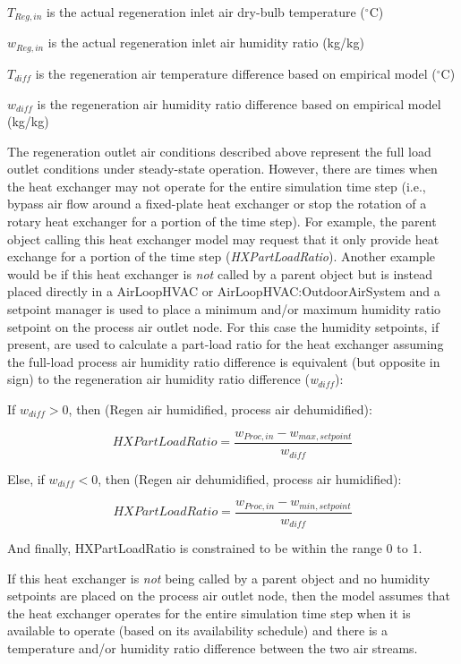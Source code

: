 \({T_{Reg,in}}\) is the actual regeneration inlet air dry-bulb temperature (\(^{\circ}\)C)

\({w_{Reg,in}}\) is the actual regeneration inlet air humidity ratio (kg/kg)

\({T_{diff}}\) is the regeneration air temperature difference based on empirical model (\(^{\circ}\)C)

\({w_{diff}}\) is the regeneration air humidity ratio difference based on empirical model (kg/kg)

The regeneration outlet air conditions described above represent the full load outlet conditions under steady-state operation. However, there are times when the heat exchanger may not operate for the entire simulation time step (i.e., bypass air flow around a fixed-plate heat exchanger or stop the rotation of a rotary heat exchanger for a portion of the time step). For example, the parent object calling this heat exchanger model may request that it only provide heat exchange for a portion of the time step (\emph{HXPartLoadRatio}). Another example would be if this heat exchanger is \emph{not} called by a parent object but is instead placed directly in a AirLoopHVAC or AirLoopHVAC:OutdoorAirSystem and a setpoint manager is used to place a minimum and/or maximum humidity ratio setpoint on the process air outlet node. For this case the humidity setpoints, if present, are used to calculate a part-load ratio for the heat exchanger assuming the full-load process air humidity ratio difference is equivalent (but opposite in sign) to the regeneration air humidity ratio difference (\emph{w\(_{diff}\)}):

If $w_{diff}>0$, then (Regen air humidified, process air dehumidified):

\begin{equation}
  HXPartLoadRatio = \frac{w_{Proc,in} - w_{max,setpoint}}{w_{diff}}
\end{equation}

Else, if $w_{diff} <0$, then (Regen air dehumidified, process air humidified):

\begin{equation}
  HXPartLoadRatio = \frac{w_{Proc,in} - w_{min,setpoint}}{w_{diff}}
\end{equation}

And finally, HXPartLoadRatio is constrained to be within the range 0 to 1.

If this heat exchanger is \emph{not} being called by a parent object and no humidity setpoints are placed on the process air outlet node, then the model assumes that the heat exchanger operates for the entire simulation time step when it is available to operate (based on its availability schedule) and there is a temperature and/or humidity ratio difference between the two air streams.

